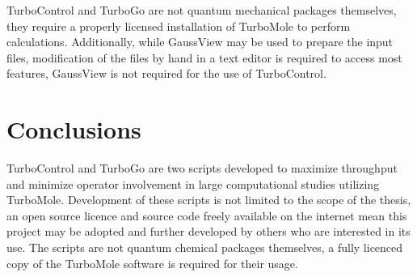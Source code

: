 TurboControl and TurboGo are not quantum mechanical packages themselves, they require a properly licensed installation of TurboMole to perform calculations. Additionally, while GaussView may be used to prepare the input files, modification of the files by hand in a text editor is required to access most features, GaussView is not required for the use of TurboControl. 

\section{Conclusions}

TurboControl and TurboGo are two scripts developed to maximize throughput and minimize operator involvement in large computational studies utilizing TurboMole. Development of these scripts is not limited to the scope of the thesis, an open source licence and source code freely available on the internet mean this project may be adopted and further developed by others who are interested in its use. The scripts are not quantum chemical packages themselves, a fully licenced copy of the TurboMole software is required for their usage.


